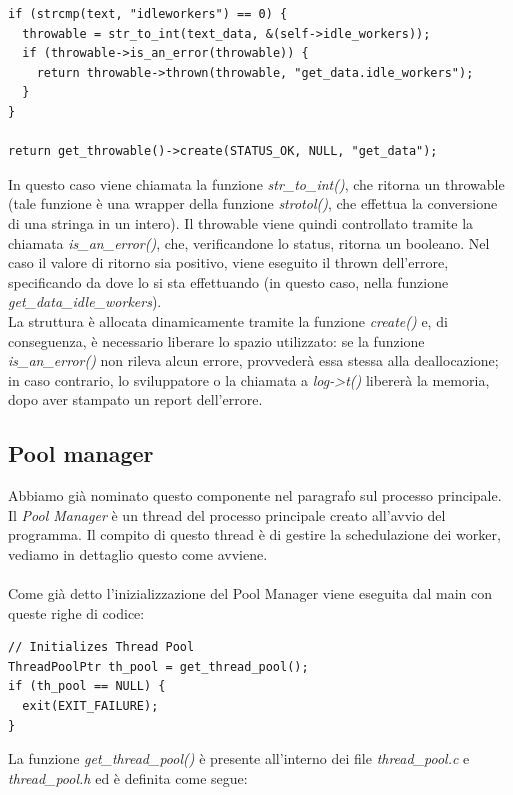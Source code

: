 \documentclass[italian]{tktltiki2}
\begin{document}
\begin{lstlisting}
if (strcmp(text, "idleworkers") == 0) {
  throwable = str_to_int(text_data, &(self->idle_workers));
  if (throwable->is_an_error(throwable)) {
    return throwable->thrown(throwable, "get_data.idle_workers");
  }
}

return get_throwable()->create(STATUS_OK, NULL, "get_data");
\end{lstlisting}
In questo caso viene chiamata la funzione \emph{str\_to\_int()}, che ritorna un throwable (tale funzione è una wrapper della funzione \emph{strotol()}, che effettua la conversione di una stringa in un intero). Il throwable viene quindi controllato tramite la chiamata \emph{is\_an\_error()}, che, verificandone lo status, ritorna un booleano. Nel caso il valore di ritorno sia positivo, viene eseguito il thrown dell'errore, specificando da dove lo si sta effettuando (in questo caso, nella funzione \emph{get\_data\_idle\_workers}).
\\
La struttura è allocata dinamicamente tramite la funzione \emph{create()} e, di conseguenza, è necessario liberare lo spazio utilizzato: se la funzione \emph{is\_an\_error()} non rileva alcun errore, provvederà essa stessa alla deallocazione; in caso contrario, lo sviluppatore o la chiamata a \emph{log->t()} libererà la memoria, dopo aver stampato un report dell'errore.

\subsection{Pool manager}
\label{ssec:pool}
Abbiamo già nominato questo componente nel paragrafo sul processo principale. Il \emph{Pool Manager} è un thread del processo principale creato all'avvio del programma. Il compito di questo thread è di gestire la schedulazione dei worker, vediamo in dettaglio questo come avviene.\\\\ Come già detto l'inizializzazione del Pool Manager viene eseguita dal main con queste righe di codice:
\begin{lstlisting}
// Initializes Thread Pool
ThreadPoolPtr th_pool = get_thread_pool();
if (th_pool == NULL) {
  exit(EXIT_FAILURE);
}
\end{lstlisting}
La funzione \emph{get\_thread\_pool()} è presente all'interno dei file \emph{thread\_pool.c} e \emph{thread\_pool.h} ed è definita come segue:
\end{document}
